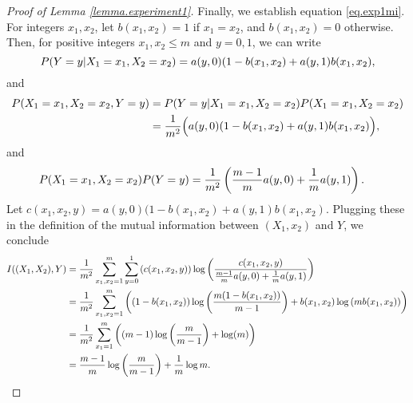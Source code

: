 \begin{proof}[Proof of Lemma \ref{lemma.experiment1}]
	Finally, we establish equation \eqref{eq.exp1mi}.
	For integers $x_1, x_2$, 
	let 
	$b(x_1, x_2) = 1$ if $x_1 = x_2$,
	and $b(x_1, x_2) = 0$ otherwise.
	Then, 
	for positive integers $x_1, x_2 \leq m$ and $y=0, 1$,
	we can write
	\begin{equation*}
		\Prob(Y=y \vert X_1 = x_1, X_2 = x_2)
		=
		a(y, 0)( 1 - b(x_1, x_2)
		+
		a(y, 1) b(x_1, x_2),
	\end{equation*}
	and
	\begin{equation*}
		\begin{split}
		\Prob(X_1 = x_1, X_2 = x_2, Y = y)
			&=
		\Prob(Y=y \vert X_1 = x_1, X_2 = x_2)
		\Prob(X_1 = x_1, X_2 = x_2)
		\\
			&=
		\frac{1}{m\squared}
		\Big(
		a(y, 0)( 1 - b(x_1, x_2)
		+
		a(y, 1) b(x_1, x_2)
		\Big),
		\end{split}
	\end{equation*}
	and
	\begin{equation*}
		\begin{split}
			\Prob(X_1 = x_1, X_2 = x_2) \Prob(Y = y)
			&=
			\frac{1}{m\squared}
			\left(
			\frac{m-1}{m} a(y, 0)
			+
			\frac{1}{m} a(y, 1)
			\right).
		\end{split}
	\end{equation*}
	Let 
	$c(x_1, x_2, y) = 
			a(y, 0)( 1 - b(x_1, x_2)
			+
			a(y, 1) b(x_1, x_2)
			$.
	Plugging these in the definition of the mutual information between $(X_1, x_2)$ and $Y$,
	we conclude
	\begin{equation*}
		\begin{split}
			I((X_1, X_2), Y)
			& =
			\frac{1}{m\squared}
			\sum_{x_1, x_2 = 1}^{m}
			\sum_{y=0}^{1}
			\left(
			c(x_1, x_2, y)
			\right)
			\log
			\left(
			\frac
			{
			c(x_1, x_2, y)
			}
			{
				\frac{m-1}{m} a(y, 0) + \frac{1}{m} a(y, 1)
			}
			\right)
			\\
			& = 
			\frac{1}{m\squared}
			\sum_{x_1, x_2 = 1}^{m}
			\left(
			(1 - b(x_1, x_2))
			\log
			\left(
			\frac{m(1-b(x_1, x_2))}{m-1}
			\right)
			+
			b(x_1, x_2)
			\log
			\left(
			m b(x_1, x_2)
			\right)
			\right)
			\\
			& =
			\frac{1}{m\squared}
			\sum_{x_1 = 1}^{m}
			\left(
			(m-1)\log\left(\frac{m}{m-1}\right) + \log(m)
			\right)
			\\
			& =
			\frac{m-1}{m} \log\left(\frac{m}{m-1}\right)
			+
			\frac{1}{m}\log m
			.
		\end{split}
	\end{equation*}

\end{proof}
